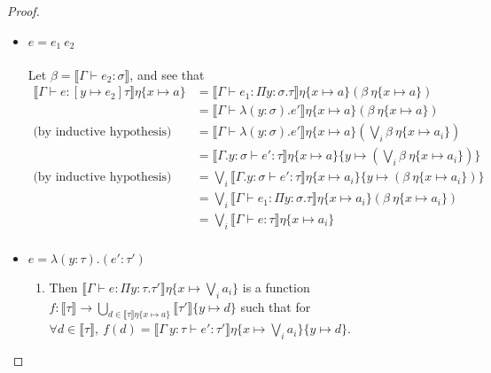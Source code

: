 \begin{proof}
\begin{itemize}
 \item $ e = e_1 \ e_2$ \\ \\
Let $\beta = \llbracket \Gamma \vdash e_2 : \sigma \rrbracket$, and see that
\begin{align*}
\llbracket \Gamma \vdash e : [y \mapsto e_2]\tau \rrbracket\eta\{x \mapsto a \} &=
\llbracket \Gamma \vdash e_1 : \Pi y: \sigma.\tau \rrbracket\eta\{x \mapsto a\}
(\beta \ \eta\{x \mapsto a\}) \\
&= \llbracket \Gamma \vdash \lambda (y:\sigma).e'  \rrbracket\eta\{x \mapsto a\}
(\beta \ \eta\{x \mapsto a\}) \\
\text{(by inductive hypothesis)} &= 
\llbracket \Gamma \vdash \lambda (y:\sigma).e' \rrbracket\eta\{x \mapsto a\}
(\bigvee_i \beta \ \eta\{x \mapsto a_i\}) \\
&= \llbracket \Gamma. y : \sigma \vdash e' : \tau \rrbracket\eta\{x \mapsto a\}\{y \mapsto (\bigvee_i \beta \ \eta\{x \mapsto a_i\})\} \\
\text{(by inductive hypothesis)}&= \bigvee_i \llbracket \Gamma. y : \sigma \vdash e' : \tau \rrbracket\eta\{x \mapsto 
a_i\}\{y \mapsto (\beta \ \eta\{x \mapsto a_i\})\} \\
&=\bigvee_i \llbracket \Gamma \vdash e_1: \Pi y:\sigma.\tau\rrbracket\eta\{x\mapsto a_i\}
(\beta \ \eta\{x\mapsto a_i\}) \\
&= \bigvee_i \llbracket \Gamma \vdash e:\tau\rrbracket\eta\{ x \mapsto a_i\} \\
\end{align*}
 \item $e = \lambda (y : \tau) . (e' : \tau')$
 \begin{enumerate}
 \item Then $\llbracket \Gamma \vdash e : \Pi y: \tau.\tau' \rrbracket\eta\{x\mapsto  \bigvee_i a_i\}$ 
 is a function $f: \llbracket \tau \rrbracket \rightarrow \bigcup_{d \in \llbracket \tau \rrbracket\eta\{x\mapsto a\}}\llbracket 
 \tau'  \rrbracket\{y\mapsto d\}$ such that for 
 $\forall d \in \llbracket \tau \rrbracket, \ f(d) = \llbracket \Gamma \ y : \tau \vdash e' : \tau' 
 \rrbracket\eta\{x\mapsto  \bigvee_i a_i\}\{y \mapsto d\}$. 
 

\end{enumerate}
\end{itemize}
\end{proof}
